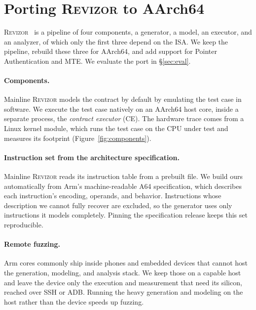\documentclass[letterpaper,twocolumn,10pt]{article}
\theoremstyle{definition}
\newif\ifshowexecfsm
\newif\ifshowspectree  \showspectreefalse   %
\begin{document}
\section{Porting \textsc{Revizor} to AArch64}
\label{sec:port}
\textsc{Revizor}~\cite{revizor} is a pipeline of four components, a generator, a model, an
executor, and an analyzer, of which only the first three depend on the ISA. We keep the
pipeline, rebuild these three for AArch64, and add support for Pointer Authentication and MTE.
We evaluate the port in \S\ref{sec:eval}.

\paragraph{Components.}
Mainline \textsc{Revizor} models the contract by default by emulating the test case in software.
We execute the test case natively on an AArch64 host core, inside a separate process, the
\emph{contract executor} (CE). The hardware trace comes from a Linux kernel module, which runs
the test case on the CPU under test and measures its footprint (Figure~\ref{fig:components}).

\paragraph{Instruction set from the architecture specification.}
Mainline \textsc{Revizor} reads its instruction table from a prebuilt file. We build ours
automatically from Arm's machine-readable A64 specification, which describes each instruction's
encoding, operands, and behavior. Instructions whose description we cannot fully recover are
excluded, so the generator uses only instructions it models
completely. Pinning the specification release keeps this set reproducible.

\paragraph{Remote fuzzing.}
Arm cores commonly ship inside phones and embedded devices that cannot host the generation,
modeling, and analysis stack. We keep those on a capable host and leave the device only the
execution and measurement that need its silicon, reached over SSH or ADB. Running the heavy
generation and modeling on the host rather than the device speeds up fuzzing.
\end{document}
